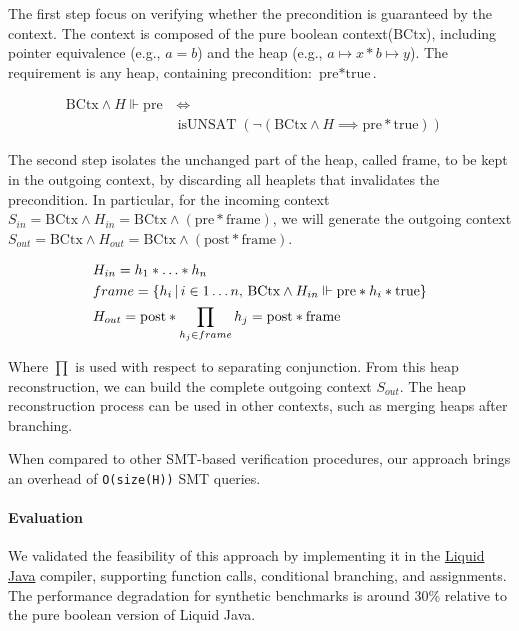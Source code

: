 \documentclass[sigplan,screen,review]{acmart}
\begin{document}
The first step focus on verifying whether the precondition is guaranteed by the context. The context is composed of the pure boolean context($\mbox{BCtx}$), including pointer equivalence (e.g., $a=b$) and the heap (e.g., $a \mapsto x * b \mapsto y$). The requirement is any heap, containing precondition: $\text{pre} * \text{true}$.

\begin{align*}
\mbox{BCtx} \wedge H \Vdash \mbox{pre} & \, \iff & \\ & \operatorname{isUNSAT}(\neg(\mbox{BCtx} \wedge H \implies \mbox{pre} \mathbin{*} \mbox{true} ))
\end{align*}



The second step isolates the unchanged part of the heap, called $\mbox{frame}$, to be kept in the outgoing context, by discarding all heaplets that invalidates the precondition. In particular, for the incoming context $S_{in} = \mbox{BCtx} \wedge H_{in} = \mbox{BCtx} \wedge (\text{pre} * \text{frame})$, we will generate the outgoing context $S_{out} = \text{BCtx} \wedge H_{out} = \text{BCtx} \wedge (\text{post} * \text{frame})$. 

\begin{align*}
&H_{in} = h_1 \mathbin{*} \dots \mathbin{*} h_n\\
&frame = \* \{ h_i  \,|\, i \in 1\dots n,\, \mbox{BCtx} \wedge H_{in} \Vdash \mbox{pre} \mathbin{*} h_i  \mathbin{*} \text{true} \}\\
&H_{out} = \text{post} \mathbin{*} \prod_{h_j \in frame} h_j = \text{post} \mathbin{*} \text{frame}
\end{align*}

Where $\prod$ is used with respect to separating conjunction. From this heap reconstruction, we can build the complete outgoing context $S_{out}$. The heap reconstruction process can be used in other contexts, such as merging heaps after branching.

When compared to other SMT-based verification procedures, our approach brings an overhead of \texttt{O(size(H))} SMT queries.

\paragraph{Evaluation} We validated the feasibility of this approach by implementing it in the \href{https://catarinagamboa.github.io/liquidjava.html}{Liquid Java} compiler, supporting function calls, conditional branching, and assignments. The performance degradation for synthetic benchmarks is around 30\% relative to the pure boolean version of Liquid Java.
\end{document}
